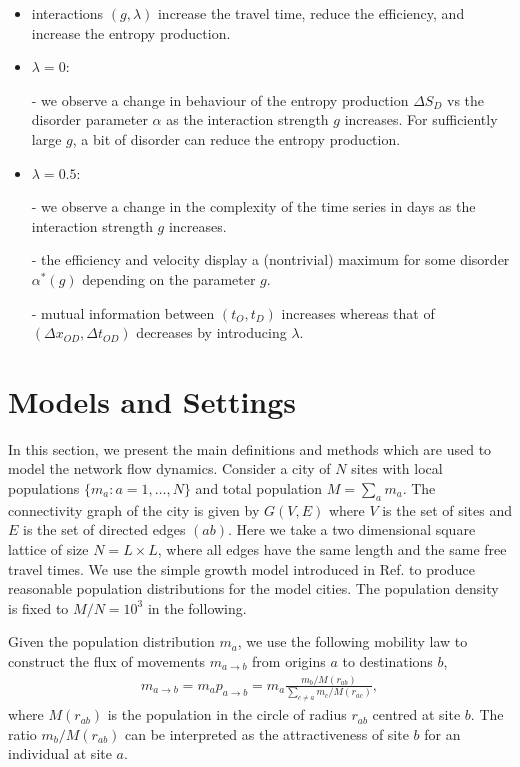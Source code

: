 \documentclass[aps,preprint]{revtex4-1}
\begin{document}
\begin{itemize}

\item interactions $(g,\lambda)$ increase the travel time, reduce the efficiency, and increase the entropy production.


\item $\lambda=0$: 

- we observe a change in behaviour of the entropy production $\Delta S_D$ vs the disorder parameter $\alpha$ as the interaction strength $g$ increases.  For sufficiently large $g$, a bit of disorder can reduce the entropy production. 


\item $\lambda=0.5$: 

- we observe a change in the complexity of the time series in days as the interaction strength $g$ increases.

- the efficiency and velocity display a (nontrivial) maximum for some disorder $\alpha^*(g)$ depending on the parameter $g$.  

- mutual information between $(t_O,t_D)$ increases whereas that of $(\Delta x_{OD},\Delta t_{OD})$ decreases by introducing $\lambda$. 



\end{itemize}


\section{Models and Settings}\label{S1}
In this section, we present the main definitions and methods which are used to model the network flow dynamics.   
Consider a city of $N$ sites with local populations $\{m_a:a=1,\dots,N\}$ and total population $M=\sum_a m_a$. The connectivity graph of the city is given by $G(V,E)$ where $V$ is the set of sites and $E$ is the set of directed edges $(ab)$. Here we take a two dimensional square lattice of size $N=L\times L$, where all edges have the same length and the same free travel times. We use the simple growth model introduced in Ref. \cite{Li-nc-2017} to produce reasonable population distributions for the model cities. The population density is fixed to $M/N=10^3$ in the following.

Given the population distribution $m_a$, we use the following mobility law to construct the flux of movements $m_{a\to b}$ from origins $a$ to destinations $b$, 
\begin{align}\label{mab}
m_{a\to b}=m_ap_{a\to b}=m_a\frac{m_b/M(r_{ab})}{\sum_{c\neq a} m_c/M(r_{ac})},
\end{align}
where $M(r_{ab})$ is the population in the circle of radius $r_{ab}$ centred at site $b$. The ratio $m_b/M(r_{ab})$ can be interpreted as the attractiveness of site $b$ for an individual at site $a$. 
\end{document}
